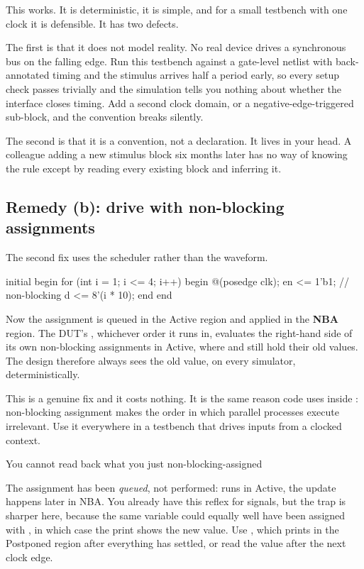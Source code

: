 This works. It is deterministic, it is simple, and for a small testbench with
one clock it is defensible. It has two defects.

The first is that it does not model reality. No real device drives a
synchronous bus on the falling edge. Run this testbench against a gate-level
netlist with back-annotated timing and the stimulus arrives half a period
early, so every setup check passes trivially and the simulation tells you
nothing about whether the interface closes timing. Add a second clock domain,
or a negative-edge-triggered sub-block, and the convention breaks silently.

The second is that it is a convention, not a declaration. It lives in your
head. A colleague adding a new stimulus block six months later has no way of
knowing the rule except by reading every existing block and inferring it.

\subsection{Remedy (b): drive with non-blocking assignments}

The second fix uses the scheduler rather than the waveform.

\begin{svcode}
initial begin
  for (int i = 1; i <= 4; i++) begin
    @(posedge clk);
    en <= 1'b1;           // non-blocking
    d  <= 8'(i * 10);
  end
end
\end{svcode}

Now the assignment is queued in the Active region and applied in the
\textbf{NBA} region. The DUT's , whichever order it runs in,
evaluates the right-hand side of its own non-blocking assignments in Active,
where  and  still hold their old values. The design therefore
always sees the old value, on every simulator, deterministically.

This is a genuine fix and it costs nothing. It is the same reason \RTL{} code
uses \code{<=} inside : non-blocking assignment makes the
order in which parallel processes execute irrelevant. Use it everywhere in a
testbench that drives \DUT{} inputs from a clocked context.

\begin{gotcha}{You cannot read back what you just non-blocking-assigned}
The assignment has been \emph{queued}, not performed:  runs in
Active, the update happens later in NBA. You already have this reflex for
\VHDL{} signals, but the trap is sharper here, because the same variable could
equally well have been assigned with \code{=}, in which case the print shows
the new value. Use , which prints in the Postponed region after
everything has settled, or read the value after the next clock edge.
\end{gotcha}


